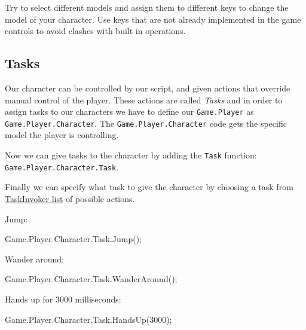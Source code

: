 \documentclass[
  openany]{book}
\newenvironment{Shaded}{\begin{snugshade}}{\end{snugshade}}
\newcommand{\DecValTok}[1]{\textcolor[rgb]{0.00,0.00,0.81}{#1}}
\newcommand{\FunctionTok}[1]{\textcolor[rgb]{0.00,0.00,0.00}{#1}}
\newcommand{\NormalTok}[1]{#1}
\begin{document}
Try to select different models and assign them to different keys to change the model of your character. Use keys that are not already implemented in the game controls to avoid clashes with built in operations.

\hypertarget{tasks}{%
\subsection*{Tasks}\label{tasks}}

Our character can be controlled by our script, and given actions that override manual control of the player. These actions are called \emph{Tasks} and in order to assign tasks to our characters we have to define our \texttt{Game.Player} as \texttt{Game.Player.Character}. The \texttt{Game.Player.Character} code gets the specific model the player is controlling.

Now we can give tasks to the character by adding the \texttt{Task} function: \texttt{Game.Player.Character.Task}.

Finally we can specify what task to give the character by choosing a task from \href{https://nitanmarcel.github.io/shvdn-docs.github.io/class_g_t_a_1_1_task_invoker.html}{TaskInvoker list} of possible actions.

Jump:

\begin{Shaded}
\begin{Highlighting}[]
\NormalTok{Game.}\FunctionTok{Player}\NormalTok{.}\FunctionTok{Character}\NormalTok{.}\FunctionTok{Task}\NormalTok{.}\FunctionTok{Jump}\NormalTok{();}
\end{Highlighting}
\end{Shaded}

Wander around:

\begin{Shaded}
\begin{Highlighting}[]
\NormalTok{Game.}\FunctionTok{Player}\NormalTok{.}\FunctionTok{Character}\NormalTok{.}\FunctionTok{Task}\NormalTok{.}\FunctionTok{WanderAround}\NormalTok{();}
\end{Highlighting}
\end{Shaded}

Hands up for 3000 milliseconds:

\begin{Shaded}
\begin{Highlighting}[]
\NormalTok{Game.}\FunctionTok{Player}\NormalTok{.}\FunctionTok{Character}\NormalTok{.}\FunctionTok{Task}\NormalTok{.}\FunctionTok{HandsUp}\NormalTok{(}\DecValTok{3000}\NormalTok{);}
\end{Highlighting}
\end{Shaded}
\end{document}
